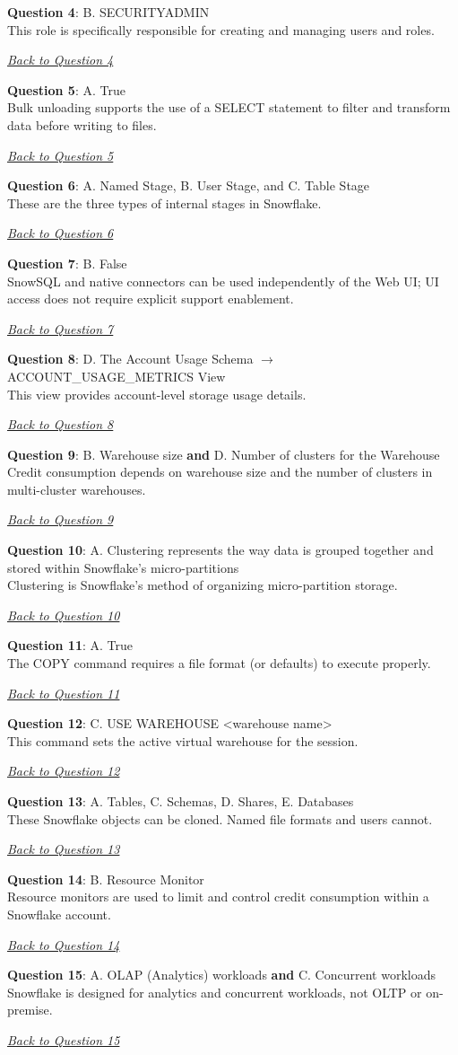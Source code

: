 \documentclass[12pt]{article}
\newcommand{\answer}[2]{%
  \textbf{Question #1}\label{ans:#1}: #2\par
  \smallskip\emph{\hyperref[q:#1]{Back to Question #1}}\par\medskip
}
\begin{document}
\answer{4}{B. SECURITYADMIN\\
This role is specifically responsible for creating and managing users and roles.}

\answer{5}{A. True\\
Bulk unloading supports the use of a SELECT statement to filter and transform data before writing to files.}

\answer{6}{A. Named Stage, B. User Stage, and C. Table Stage\\
These are the three types of internal stages in Snowflake.}

\answer{7}{B. False\\
SnowSQL and native connectors can be used independently of the Web UI; UI access does not require explicit support enablement.}

\answer{8}{D. The Account Usage Schema $\rightarrow$ ACCOUNT\_USAGE\_METRICS View\\
This view provides account-level storage usage details.}

\answer{9}{B. Warehouse size \textbf{and} D. Number of clusters for the Warehouse\\
Credit consumption depends on warehouse size and the number of clusters in multi-cluster warehouses.}

\answer{10}{A. Clustering represents the way data is grouped together and stored within Snowflake's micro-partitions\\
Clustering is Snowflake's method of organizing micro-partition storage.}

\answer{11}{A. True\\
The COPY command requires a file format (or defaults) to execute properly.}

\answer{12}{C. USE WAREHOUSE \textless warehouse name\textgreater\\
This command sets the active virtual warehouse for the session.}

\answer{13}{A. Tables, C. Schemas, D. Shares, E. Databases\\
These Snowflake objects can be cloned. Named file formats and users cannot.}

\answer{14}{B. Resource Monitor\\
Resource monitors are used to limit and control credit consumption within a Snowflake account.}

\answer{15}{A. OLAP (Analytics) workloads \textbf{and} C. Concurrent workloads\\
Snowflake is designed for analytics and concurrent workloads, not OLTP or on-premise.}
\end{document}

